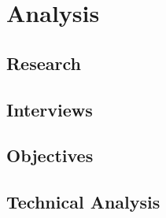 \section{Analysis}
\subsection{Research}
\subsection{Interviews}
\subsection{Objectives}
\subsection{Technical Analysis}
